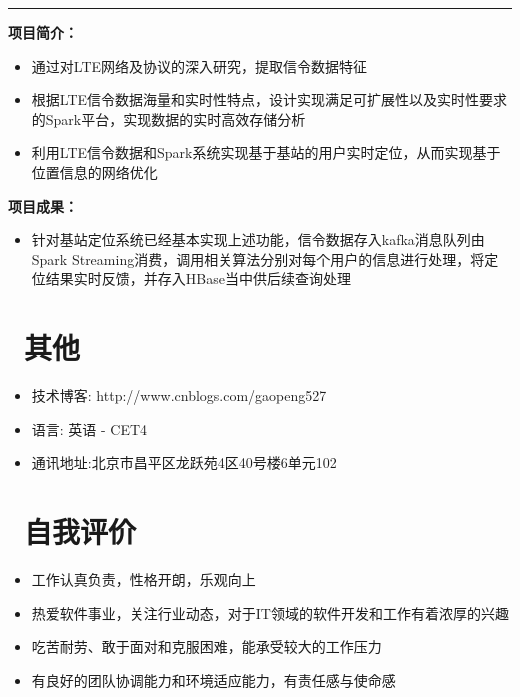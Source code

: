\documentclass{resume}
\begin{document}
\rule{\textwidth}{0.1mm}
\begin{onehalfspacing}
\textbf{项目简介：}
\begin{itemize}
  \item 通过对LTE网络及协议的深入研究，提取信令数据特征
  \item 根据LTE信令数据海量和实时性特点，设计实现满足可扩展性以及实时性要求的Spark平台，实现数据的实时高效存储分析
  \item 利用LTE信令数据和Spark系统实现基于基站的用户实时定位，从而实现基于位置信息的网络优化
\end{itemize}
\textbf{项目成果：}
\begin{itemize}
  \item 针对基站定位系统已经基本实现上述功能，信令数据存入kafka消息队列由Spark Streaming消费，调用相关算法分别对每个用户的信息进行处理，将定位结果实时反馈，并存入HBase当中供后续查询处理
\end{itemize}
\end{onehalfspacing}

\section{\faInfo\ 其他}
\begin{itemize}[parsep=0.5ex]
  \item 技术博客: http://www.cnblogs.com/gaopeng527
  \item 语\hspace{2em}言: 英语 - CET4
  \item 通讯地址:北京市昌平区龙跃苑4区40号楼6单元102
\end{itemize}

\section{\faTags\ 自我评价}
\begin{itemize}[parsep=0.5ex]
  \item 工作认真负责，性格开朗，乐观向上
  \item 热爱软件事业，关注行业动态，对于IT领域的软件开发和工作有着浓厚的兴趣
  \item 吃苦耐劳、敢于面对和克服困难，能承受较大的工作压力
  \item 有良好的团队协调能力和环境适应能力，有责任感与使命感
\end{itemize}

%
%
\end{document}
